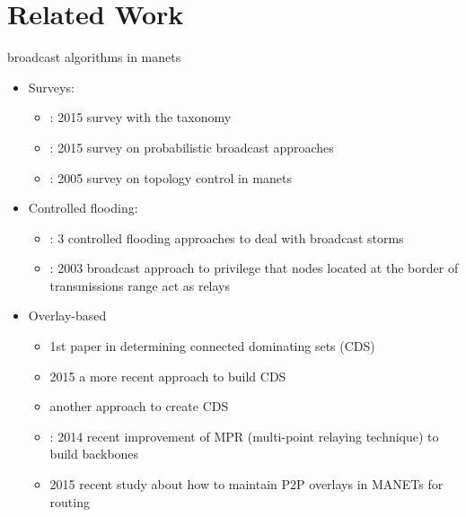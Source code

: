
\section{Related Work}
\label{sec:related}
broadcast algorithms in manets
	\begin{itemize}
		\item Surveys:
		\begin{itemize}
			\item \cite{SurveyRuiz}: 2015 survey with the taxonomy
			\item \cite{Reina2015}: 2015 survey on probabilistic broadcast approaches 
			\item \cite{Santi:2005:TCW:1089733.1089736}: 2005 survey on topology control in manets
		\end{itemize}
		\item Controlled flooding:
		\begin{itemize}
			\item \cite{BroadcastStormProblem}: 3 controlled flooding approaches to deal with broadcast storms
			\item \cite{ProbFlood}: 2003 broadcast approach to privilege that nodes located at the border of transmissions range act as relays
		\end{itemize}
		\item Overlay-based
		\begin{itemize}
			\item \cite{stojmenovic-cds} 1st paper in determining connected dominating sets (CDS)
			\item \cite{Nikolov2015} 2015 a more recent approach to build CDS
			\item \cite{mpr} another approach to create CDS
			\item \cite{mpr-improvement}: 2014 recent improvement of MPR (multi-point relaying technique) to build backbones
			\item \cite{overlays_for_manets} 2015 recent study about how to maintain P2P overlays in MANETs for routing
		\end{itemize}


	\end{itemize}


